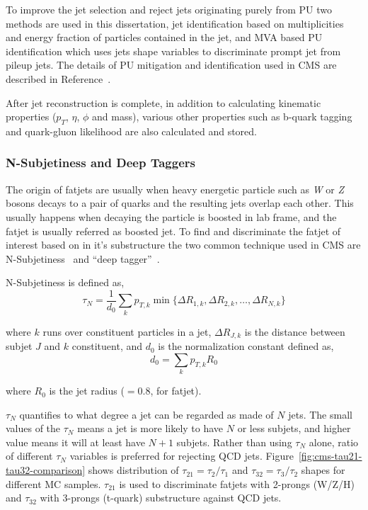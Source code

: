 To improve the jet selection and reject jets originating purely from \gls{PU}
two methods are used in this dissertation, jet identification based on
multiplicities and energy fraction of particles contained in the jet,
and \gls{MVA} based \gls{PU} identification which uses jets shape
variables to discriminate prompt jet from pileup jets.
The details of \gls{PU} mitigation and identification used in
\gls{CMS} are described in Reference~\cite{cms-jme-pu-run2}.

After jet reconstruction is complete, in addition to calculating kinematic
properties (\( p_T \), \( \eta \), \( \phi \) and mass), various other
properties such as b-quark tagging and quark-gluon likelihood are also
calculated and stored.

\subsubsection{
  N-Subjetiness and Deep Taggers
}

The origin of fatjets are usually when heavy energetic particle
such as \textit{W} or \textit{Z} bosons decays to a pair of quarks
and the resulting jets overlap each other. This usually happens
when decaying the particle is boosted in lab frame, and the fatjet
is usually referred as boosted jet.
To find and discriminate the fatjet of interest based on in it's substructure
the two common technique used in \gls{CMS} are N-Subjetiness~\cite{tau21-paper}
and ``deep tagger''~\cite{cms-jme-deep-tagger}.

N-Subjetiness is defined as,
%
\begin{equation}
  \tau_N = \frac{1}{d_0} \sum_k p_{T,k} \min \{ \Delta R_{1,k}, \Delta R_{2,k}, \ldots , \Delta R_{N,k} \}
\end{equation}

where \( k \) runs over constituent particles in a jet, \( \Delta R_{J,k} \)
is the distance between subjet \( J \) and \( k \) constituent, and \( d_0 \)
is the normalization constant defined as,
%
\begin{equation}
  d_0 = \sum_k p_{T,k} R_0
\end{equation}

where \( R_0 \) is the jet radius (\(= 0.8\), for fatjet).

\( \tau_N \) quantifies to what degree a jet can be regarded as made of \( N \) jets.
The small values of the \( \tau_N \) means a jet is more likely to have
\( N \) or less subjets, and higher value means it will at least have \( N + 1\)
subjets. Rather than using \( \tau_N \) alone, ratio of different \( \tau_N \)
variables is preferred for rejecting \gls{QCD} jets.
Figure~\ref{fig:cms-tau21-tau32-comparison} shows distribution of
\( \tau_{21} = \tau_{2}/\tau_{1}\) and \( \tau_{32} = \tau_{3}/\tau_{2}\) shapes
for different \gls{MC} samples.
\( \tau_{21} \) is used to discriminate fatjets with 2-prongs (W/Z/H)
and \( \tau_{32} \) with 3-prongs (t-quark) substructure against QCD jets.

